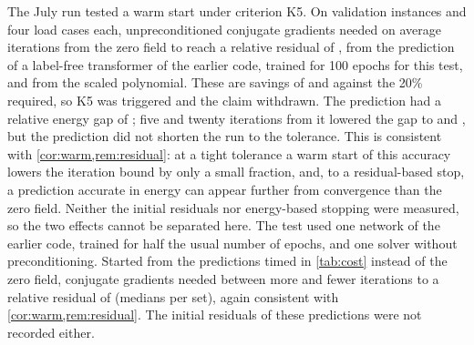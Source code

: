 The July run tested a warm start under criterion K5. On \numKfiveEval{} validation instances
and four load cases each, unpreconditioned conjugate gradients needed on average
\numKfiveZero{} iterations from the zero field to reach a relative residual of
\numKfiveTol{}, \numKfiveFree{} from the prediction of a label-free transformer of the
earlier code, trained for 100 epochs for this test, and \numKfiveNaive{} from the scaled polynomial. These are savings of \numKfiveSaving{} and
\numKfiveNaiveSaving{} against the 20\% required, so K5 was triggered and the claim withdrawn. The prediction had a relative
energy gap of \numKfiveStartGap{}; five and twenty iterations from it lowered the gap to
\numKfiveFiveGap{} and \numKfiveTwentyGap{}, but the prediction did not shorten the run to the
tolerance. This is consistent with \cref{cor:warm,rem:residual}: at a tight tolerance a warm
start of this accuracy lowers the iteration bound by only a small fraction, and, to a
residual-based stop, a prediction accurate in energy can appear further from convergence than
the zero field. Neither the initial residuals nor energy-based stopping were measured, so
the two effects cannot be separated here. The test used one network of the earlier code,
trained for half the usual number of epochs, and one solver without preconditioning. Started from
the predictions timed in \cref{tab:cost} instead of the zero field, conjugate gradients
needed between \numCostWarmMore{} more and \numCostWarmFewer{} fewer iterations to a
relative residual of \numCostCgTol{} (medians per set), again consistent with \cref{cor:warm,rem:residual}. The initial residuals of these predictions
were not recorded either.

